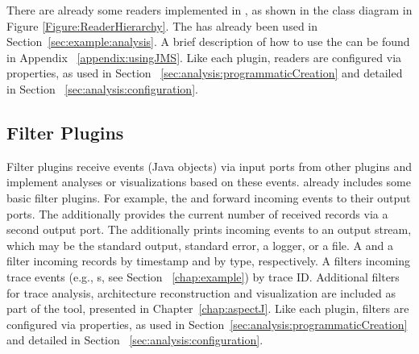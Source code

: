 
%
%


\noindent There are already some readers implemented in \Kieker,  as shown in the %
class diagram in Figure \ref{Figure:ReaderHierarchy}. %
The  has already been used in Section~\ref{sec:example:analysis}. %
A brief description of how to use the  can be found in Appendix~%
\ref{appendix:usingJMS}. 
Like each plugin, readers are configured via properties, as used in Section~%
\ref{sec:analysis:programmaticCreation} and detailed in Section~%
\ref{sec:analysis:configuration}.

\subsection{Filter Plugins}

Filter plugins receive events (Java objects) via input ports from other %
plugins and implement analyses or visualizations based on these events. %
\Kieker{} already includes some basic filter plugins. For example, the %
 and   forward incoming events %
to their output ports. The  additionally provides the %
current number of received records via a second output port. The  %
additionally prints incoming events to an output stream, which may be %
the standard output, standard error, a logger, or a file. %
A  and a  filter incoming records by %
timestamp and by type, respectively. A  filters incoming %
trace events (e.g., s, see Section~%
\ref{chap:example}) by trace ID. Additional filters for trace analysis, %
architecture reconstruction and visualization are included as part of %
the \KiekerTraceAnalysis{} tool, presented in Chapter~\ref{chap:aspectJ}. %
Like each plugin, filters are configured %
via properties, as used in Section~\ref{sec:analysis:programmaticCreation} and %
detailed in Section~%
\ref{sec:analysis:configuration}. %

%


